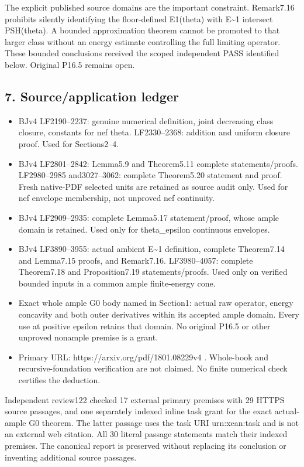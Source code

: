 \documentclass[
]{article}
\providecommand{\tightlist}{%
  \setlength{\itemsep}{0pt}\setlength{\parskip}{0pt}}
\begin{document}
The explicit published source domains are the important constraint.
Remark7.16 prohibits silently identifying the floor-defined E1(theta)
with E\textasciitilde1 intersect PSH(theta). A bounded approximation
theorem cannot be promoted to that larger class without an energy
estimate controlling the full limiting operator. These bounded
conclusions received the scoped independent PASS identified below.
Original P16.5 remains open.

\subsection{7. Source/application
ledger}\label{sourceapplication-ledger}

\begin{itemize}
\tightlist
\item
  BJv4 LF2190--2237: genuine numerical definition, joint decreasing
  class closure, constants for nef theta. LF2330--2368: addition and
  uniform closure proof. Used for Sections2--4.
\item
  BJv4 LF2801--2842: Lemma5.9 and Theorem5.11 complete
  statements/proofs. LF2980--2985 and3027--3062: complete Theorem5.20
  statement and proof. Fresh native-PDF selected units are retained as
  source audit only. Used for nef envelope membership, not unproved nef
  continuity.
\item
  BJv4 LF2909--2935: complete Lemma5.17 statement/proof, whose ample
  domain is retained. Used only for theta\_epsilon continuous envelopes.
\item
  BJv4 LF3890--3955: actual ambient E\textasciitilde1 definition,
  complete Theorem7.14 and Lemma7.15 proofs, and Remark7.16.
  LF3980--4057: complete Theorem7.18 and Proposition7.19
  statements/proofs. Used only on verified bounded inputs in a common
  ample finite-energy cone.
\item
  Exact whole ample G0 body named in Section1: actual raw operator,
  energy concavity and both outer derivatives within its accepted ample
  domain. Every use at positive epsilon retains that domain. No original
  P16.5 or other unproved nonample premise is a grant.
\item
  Primary URL: https://arxiv.org/pdf/1801.08229v4 . Whole-book and
  recursive-foundation verification are not claimed. No finite numerical
  check certifies the deduction.
\end{itemize}

Independent review122 checked 17 external primary premises with 29 HTTPS
source passages, and one separately indexed inline task grant for the
exact actual-ample G0 theorem. The latter passage uses the task URI
urn:xean:task and is not an external web citation. All 30 literal
passage statements match their indexed premises. The canonical report is
preserved without replacing its conclusion or inventing additional
source passages.
\end{document}
